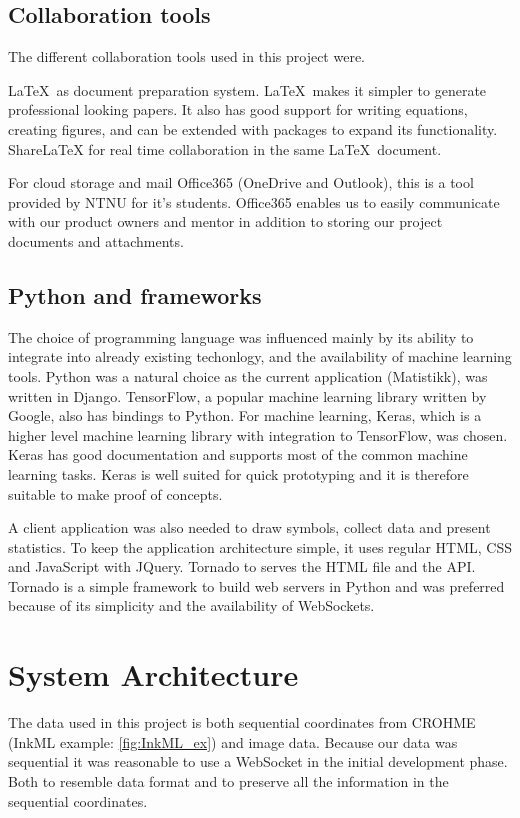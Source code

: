 \subsection{Collaboration tools}
The different collaboration tools used in this project were.

\LaTeX \ as document preparation system. \LaTeX \ makes it simpler to generate professional looking papers. It also has good support for writing equations, creating figures, and can be extended with packages to expand its functionality. ShareLaTeX for real time collaboration in the same \LaTeX \ document. 

For cloud storage and mail Office365 (OneDrive and Outlook), this is a tool provided by NTNU for it's students. Office365 enables us to easily communicate with our product owners and mentor in addition to storing our project documents and attachments.


\subsection{Python and frameworks}
The choice of programming language was influenced mainly by its ability to integrate into already existing techonlogy, and the availability of machine learning tools. Python was a natural choice as the current application (Matistikk), was written in Django. TensorFlow, a popular machine learning library written by Google, also has bindings to Python. For machine learning, Keras\cite{chollet_keras_2015}, which is a higher level machine learning library with integration to TensorFlow, was chosen. Keras has good documentation and supports most of the common machine learning tasks. Keras is well suited for quick prototyping and it is therefore suitable to make proof of concepts.

A client application was also needed to draw symbols, collect data and present statistics. To keep the application architecture simple, it uses regular HTML, CSS and JavaScript with JQuery. Tornado  to serves the HTML file and the API. Tornado is a simple framework to build web servers in Python and  was preferred because of its simplicity and the availability of WebSockets.

\section{System Architecture}
The data used in this project is both sequential coordinates from CROHME (InkML example: \ref{fig:InkML_ex}) and image data. Because our data was sequential it was reasonable to use a WebSocket in the initial development phase. Both to resemble data format and to preserve all the information in the sequential coordinates. 


